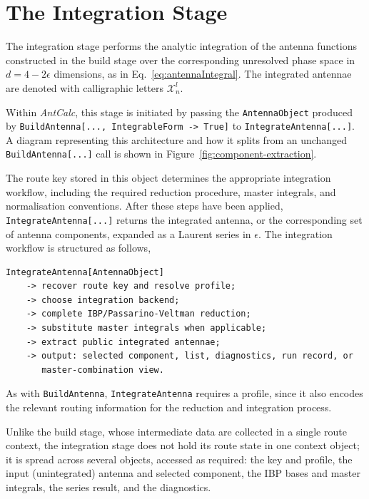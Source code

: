 \section{The Integration Stage}\label{sec:integrateStage}

The integration stage performs the analytic integration of the antenna functions constructed
in the build stage over the corresponding unresolved phase space in $d=4-2\epsilon$ dimensions,
as in Eq.~\eqref{eq:antennaIntegral}. The integrated antennae are denoted with calligraphic
letters $\mathcal X_n^l$.

Within \textit{AntCalc}, this stage is initiated by passing the \texttt{AntennaObject} produced
by \texttt{BuildAntenna[..., IntegrableForm -> True]} to \texttt{IntegrateAntenna[...]}. A 
diagram representing this architecture and how it splits from an unchanged \texttt{BuildAntenna[...]} 
call is shown in Figure~\ref{fig:component-extraction}.



The route key stored in this object determines the appropriate integration workflow, including the
required reduction procedure, master integrals, and normalisation conventions. After these
steps have been applied, \texttt{IntegrateAntenna[...]} returns the integrated antenna, or the
corresponding set of antenna components, expanded as a Laurent series in $\epsilon$. The
integration workflow is structured as follows,

\begin{mdframed}[backgroundcolor=gray!10, linewidth=0pt]
\begin{lstlisting}
IntegrateAntenna[AntennaObject]
    -> recover route key and resolve profile;
    -> choose integration backend;
    -> complete IBP/Passarino-Veltman reduction;
    -> substitute master integrals when applicable;
    -> extract public integrated antennae;
    -> output: selected component, list, diagnostics, run record, or 
       master-combination view.
\end{lstlisting}
\end{mdframed}

As with \texttt{BuildAntenna}, \texttt{IntegrateAntenna} requires a profile, since it also encodes the relevant routing information 
for the reduction and integration process. 

Unlike the build stage, whose intermediate data are collected in a single route context, the
integration stage does not hold its route state in one context object; it is spread across
several objects, accessed as required: the key and profile, the input
(unintegrated) antenna and selected component, the IBP bases and master integrals, the series
result, and the diagnostics.

